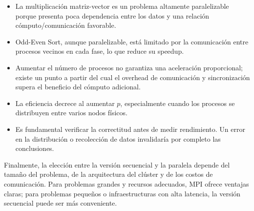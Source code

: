 \documentclass[12pt,a4paper]{article}
\begin{document}
\begin{itemize}
    \item La multiplicación matriz-vector es un problema altamente paralelizable porque presenta poca dependencia entre los datos y una relación cómputo/comunicación favorable.
    \item Odd-Even Sort, aunque paralelizable, está limitado por la comunicación entre procesos vecinos en cada fase, lo que reduce su speedup.
    \item Aumentar el número de procesos no garantiza una aceleración proporcional; existe un punto a partir del cual el overhead de comunicación y sincronización supera el beneficio del cómputo adicional.
    \item La eficiencia decrece al aumentar $p$, especialmente cuando los procesos se distribuyen entre varios nodos físicos.
    \item Es fundamental verificar la correctitud antes de medir rendimiento. Un error en la distribución o recolección de datos invalidaría por completo las conclusiones.
\end{itemize}

Finalmente, la elección entre la versión secuencial y la paralela depende del tamaño del problema, de la arquitectura del clúster y de los costos de comunicación. Para problemas grandes y recursos adecuados, MPI ofrece ventajas claras; para problemas pequeños o infraestructuras con alta latencia, la versión secuencial puede ser más conveniente.
\end{document}

